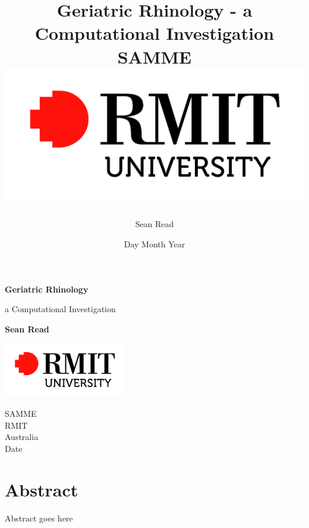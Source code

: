 \documentclass{report}
\begin{document}
\title{
	{Geriatric Rhinology - a Computational Investigation}\\
	{\large SAMME}\\
	{\includegraphics{rmit.jpg}}
}
\author{Sean Read}
\date{Day Month Year}
\begin{titlepage}
    \begin{center}
        \vspace*{1cm}
        
        \Huge
	\textbf{Geriatric Rhinology}
        
        \vspace{0.5cm}
        \LARGE
        a Computational Investigation
        \vspace{1.5cm}
        
        \textbf{Sean Read}
        
        \vfill
        
        \vspace{0.8cm}
        
        \includegraphics[width=0.4\textwidth]{rmit}
        
        \Large
        SAMME\\
        RMIT\\
        Australia\\
        Date
        
    \end{center}
\end{titlepage}

\chapter*{Abstract}
Abstract goes here
\end{document}
